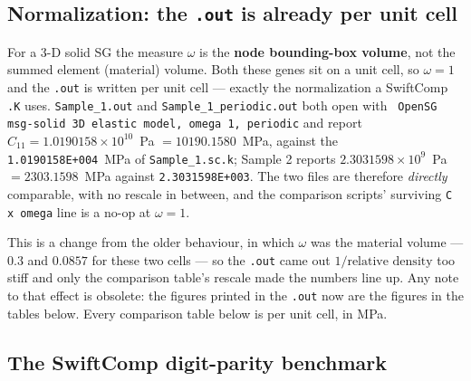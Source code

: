 \subsection{Normalization: the \texttt{.out} is already per unit cell}

For a 3-D solid SG the measure $\omega$ is the \textbf{node bounding-box
volume}, not the summed element (material) volume. Both these genes sit on a
unit cell, so $\omega = 1$ and the \texttt{.out} is written per unit cell ---
exactly the normalization a SwiftComp \texttt{.K} uses.
\texttt{Sample\_1.out} and \texttt{Sample\_1\_periodic.out} both open with
\texttt{ OpenSG msg-solid 3D elastic model, omega 1, periodic} and report
$C_{11} = 1.0190158\times10^{10}$~Pa $= 10190.1580$~MPa, against the
\texttt{1.0190158E+004}~MPa of \texttt{Sample\_1.sc.k}; Sample 2 reports
$2.3031598\times10^{9}$~Pa $= 2303.1598$~MPa against \texttt{2.3031598E+003}. The
two files are therefore \emph{directly} comparable, with no rescale in between,
and the comparison scripts' surviving \texttt{C x omega} line is a no-op at
$\omega = 1$.

This is a change from the older behaviour, in which $\omega$ was the material
volume --- $0.3$ and $0.0857$ for these two cells --- so the \texttt{.out} came
out $1/\text{relative density}$ too stiff and only the comparison table's
rescale made the numbers line up. Any note to that effect is obsolete: the
figures printed in the \texttt{.out} now are the figures in the tables below.
Every comparison table below is per unit cell, in MPa.

\subsection{The SwiftComp digit-parity benchmark}

